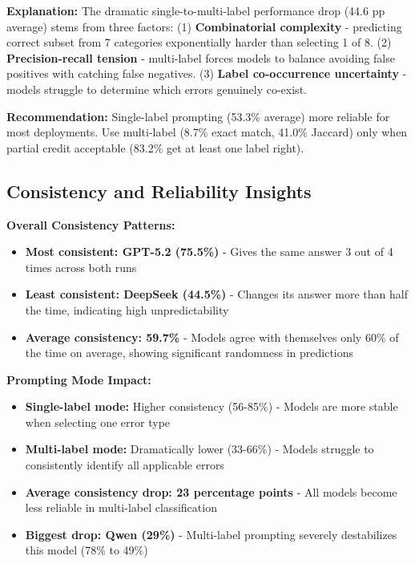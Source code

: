 \documentclass[12pt,a4paper]{article}
\begin{document}
\textbf{Explanation:} The dramatic single-to-multi-label performance drop (44.6 pp average) stems from three factors: (1) \textbf{Combinatorial complexity} - predicting correct subset from 7 categories exponentially harder than selecting 1 of 8. (2) \textbf{Precision-recall tension} - multi-label forces models to balance avoiding false positives with catching false negatives. (3) \textbf{Label co-occurrence uncertainty} - models struggle to determine which errors genuinely co-exist.

\textbf{Recommendation:} Single-label prompting (53.3\% average) more reliable for most deployments. Use multi-label (8.7\% exact match, 41.0\% Jaccard) only when partial credit acceptable (83.2\% get at least one label right).

\subsection{Consistency and Reliability Insights}

\textbf{Overall Consistency Patterns:}
\begin{itemize}[leftmargin=*]
    \item \textbf{Most consistent: GPT-5.2 (75.5\%)} - Gives the same answer 3 out of 4 times across both runs
    
    \item \textbf{Least consistent: DeepSeek (44.5\%)} - Changes its answer more than half the time, indicating high unpredictability
    
    \item \textbf{Average consistency: 59.7\%} - Models agree with themselves only 60\% of the time on average, showing significant randomness in predictions
\end{itemize}

\textbf{Prompting Mode Impact:}
\begin{itemize}[leftmargin=*]
    \item \textbf{Single-label mode:} Higher consistency (56-85\%) - Models are more stable when selecting one error type
    
    \item \textbf{Multi-label mode:} Dramatically lower (33-66\%) - Models struggle to consistently identify all applicable errors
    
    \item \textbf{Average consistency drop: 23 percentage points} - All models become less reliable in multi-label classification
    
    \item \textbf{Biggest drop: Qwen (29\%)} - Multi-label prompting severely destabilizes this model (78\% to 49\%)
\end{itemize}
\end{document}
